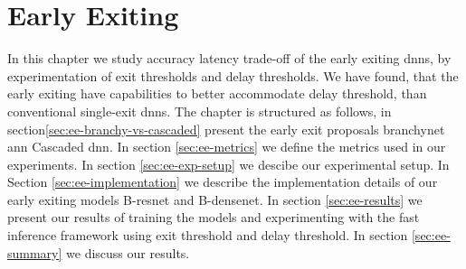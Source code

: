 \hypertarget{earlyexiting}{%
	\chapter{Early Exiting}\label{ch:earlyexit}}
\thispagestyle{fancy}

In this chapter we study accuracy latency trade-off of the early exiting \gls{dnn}s, by experimentation of exit thresholds and delay thresholds. We have found, that the early exiting have capabilities to better accommodate delay threshold, than conventional single-exit \gls{dnn}s. The chapter is structured as follows, in section\ref{sec:ee-branchy-vs-cascaded}   present the early exit proposals \gls{branchynet} ann Cascaded \gls{dnn}. In section \ref{sec:ee-metrics} we define the metrics used in our experiments. In section \ref{sec:ee-exp-setup} we descibe our experimental setup. In Section \ref{sec:ee-implementation} we describe the implementation details of our early exiting models B-\gls{resnet} and B-\gls{densenet}. In section \ref{sec:ee-results} we present our results of training the models and experimenting with the fast inference framework using exit threshold and delay threshold. In section \ref{sec:ee-summary} we discuss our results.




%

